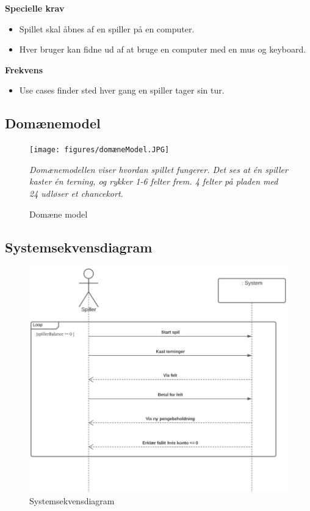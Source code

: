         \textbf{Specielle krav} 
        \begin{itemize}
            \item Spillet skal åbnes af en spiller på en computer.
            \item Hver bruger kan fidne ud af at bruge en computer med en mus og keyboard.
        \end{itemize}
        
        \textbf{Frekvens}
        \begin{itemize}
            \item Use cases finder sted hver gang en spiller tager sin tur. 
        \end{itemize}
        
        
    \subsection{Domænemodel}
        \begin{figure}[H]
            \centering
            \texttt{[image: figures/domæneModel.JPG]}
            \caption{Domæne model}
            \emph{Domænemodellen viser hvordan spillet fungerer. Det ses at én spiller kaster én terning, og rykker 1-6 felter frem. 4 felter på pladen med 24 udløser et chancekort.}
        \end{figure}
    \subsection{Systemsekvensdiagram}
        \begin{figure}[H]
            \centering
            \includegraphics[width=14cm]{figures/overordnetSystemSekvensDiagram.JPG}
            \caption{Systemsekvensdiagram}
        \end{figure}

